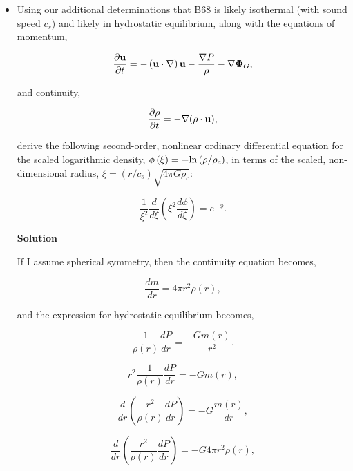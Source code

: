 \documentclass[12pt]{article}
\begin{document}
\begin{itemize}

\item Using our additional determinations that B68 is likely isothermal (with sound speed $c_s$) and likely in hydrostatic equilibrium, along with the equations of momentum,

\begin{equation*}
\frac{\partial {\bf u}}{\partial t} = -\left({\bf u}\cdot \nabla \right){\bf u} - \frac{\nabla P}{\rho} - \nabla{\bf \Phi}_G,
\end{equation*}

\noindent and continuity, 

\begin{equation*}
\frac{\partial \rho}{\partial t} = -\nabla (\rho \cdot {\bf u}),
\end{equation*}

derive the following second-order, nonlinear ordinary differential equation for the scaled logarithmic density, $\phi\left(\xi\right) = -{\rm ln}\left(\rho/\rho_c\right)$, in terms of the scaled, non-dimensional radius, $\xi = \left(r/c_s\right)\sqrt{4\pi G\rho_c}$:

\begin{equation*}
\frac{1}{\xi^2}\frac{d}{d\xi}\left(\xi^2\frac{d\phi}{d\xi} \right) = e^{-\phi}.
\end{equation*}

{\bf Solution}

If I assume spherical symmetry, then the continuity equation becomes,

\begin{equation}
\frac{dm}{dr} = 4\pi r^2 \rho(r),
\end{equation}

and the expression for hydrostatic equilibrium becomes, 

\begin{equation}
\frac{1}{\rho(r)}\frac{dP}{dr} = - \frac{Gm(r)}{r^2}.
\end{equation}

\begin{equation}
r^2\frac{1}{\rho(r)}\frac{dP}{dr} = - Gm(r), 
\end{equation}

\begin{equation}
\frac{d}{dr}(\frac{r^2}{\rho(r)}\frac{dP}{dr}) = - G\frac{m(r)}{dr}, 
\end{equation}

\begin{equation}
\frac{d}{dr}(\frac{r^2}{\rho(r)}\frac{dP}{dr}) = - G4\pi r^2 \rho(r),
\end{equation}


\end{itemize}
\end{document}
